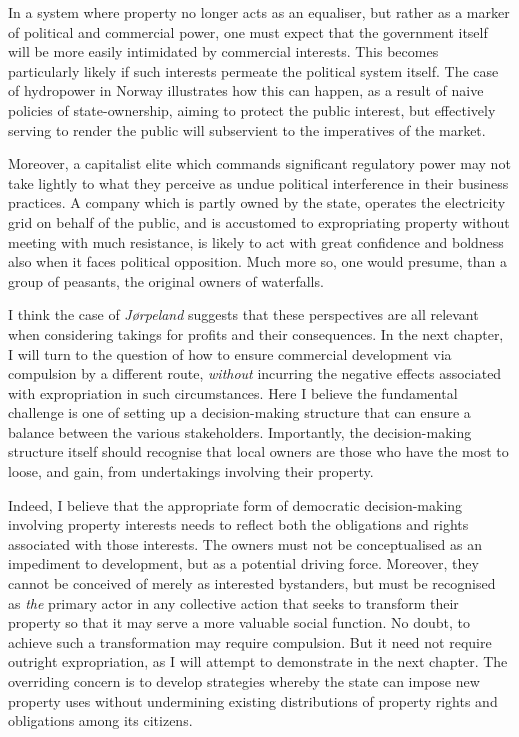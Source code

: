 In a system where property no longer acts as an equaliser, but rather as a marker of political and commercial power, one must expect that the government itself will be more easily intimidated by commercial interests. This becomes particularly likely if such interests permeate the political system itself. The case of hydropower in Norway illustrates how this can happen, as a result of naive policies of state-ownership, aiming to protect the public interest, but effectively serving to render the public will subservient to the imperatives of the market. 

Moreover, a capitalist elite which commands significant regulatory power may not take lightly to what they perceive as undue political interference in their business practices. A company which is partly owned by the state, operates the electricity grid on behalf of the public, and is accustomed to expropriating property without meeting with much resistance, is likely to act with great confidence and boldness also when it faces political opposition. Much more so, one would presume, than a group of peasants, the original owners of waterfalls.

I think the case of \emph{Jørpeland} suggests that these perspectives are all relevant when considering takings for profits and their consequences. In the next chapter, I will turn to the question of how to ensure commercial development via compulsion by a different route, {\it without} incurring the negative effects associated with expropriation in such circumstances. Here I believe the fundamental challenge is one of setting up a decision-making structure that can ensure a balance between the various stakeholders. Importantly, the decision-making structure itself should recognise that local owners are those who have the most to loose, and gain, from undertakings involving their property. 

Indeed, I believe that the appropriate form of democratic decision-making involving property interests needs to reflect both the obligations and rights associated with those interests. The owners must not be conceptualised as an impediment to development, but as a potential driving force. Moreover, they cannot be conceived of merely as interested bystanders, but must be recognised as {\it the} primary actor in any collective action that seeks to transform their property so that it may serve a more valuable social function. No doubt, to achieve such a transformation may require compulsion. But it need not require outright expropriation, as I will attempt to demonstrate in the next chapter. The overriding concern is to develop strategies whereby the state can impose new property uses without undermining existing distributions of property rights and obligations among its citizens.


